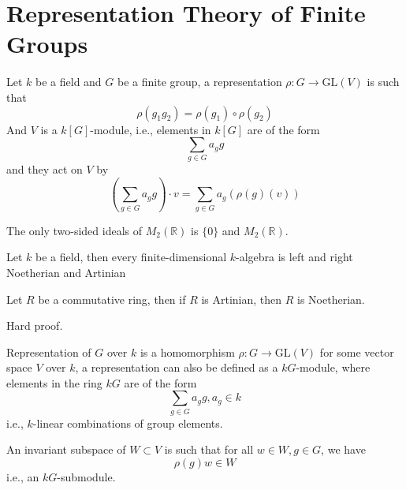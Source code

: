 \documentclass[openany]{book}
\newcommand{\R}{\mathbb{R}}
\newcommand{\gl}{\text{GL}}
\begin{document}
\chapter{Representation Theory of Finite Groups}



Let $k$ be a field and $G$ be a finite group, a representation $\rho: G\to\text{GL}(V)$ is such that 
\begin{equation*}
    \rho(g_1g_2)=\rho(g_1)\circ\rho(g_2)
\end{equation*}
And $V$ is a $k[G]$-module, i.e., elements in $k[G]$ are of the form 
\begin{equation*}
    \sum_{g\in G}a_gg
\end{equation*}
and they act on $V$ by 
\begin{equation*}
    \left( \sum_{g\in G}a_gg\right)\cdot v=\sum_{g\in G}a_g\left(\rho(g)(v)\right)
\end{equation*}



\begin{prop}
    The only two-sided ideals of $M_2(\R)$ is $\{0\}$ and $M_2(\R)$.
\end{prop}


\begin{prop}
    Let $k$ be a field, then every finite-dimensional $k$-algebra is left and right Noetherian and Artinian
\end{prop}

\begin{prop}
    Let $R$ be a commutative ring, then if $R$ is Artinian, then $R$ is Noetherian.
\end{prop}
Hard proof.



\begin{defn}[representation]
    Representation of $G$ over $k$ is a homomorphism $\rho:G\to\gl(V)$ for some vector space $V$ over $k$, a representation can also be defined as a $kG$-module, where elements in the ring $kG$ are of the form 
    \begin{equation*}
        \sum_{g\in G}a_gg, a_g\in k
    \end{equation*}
    i.e., $k$-linear combinations of group elements.

    An invariant subspace of $W\subset V$ is such that for all $w\in W, g\in G$, we have 
    \begin{equation*}
        \rho(g)w\in W
    \end{equation*}
    i.e., an $kG$-submodule.
\end{defn}
\end{document}
